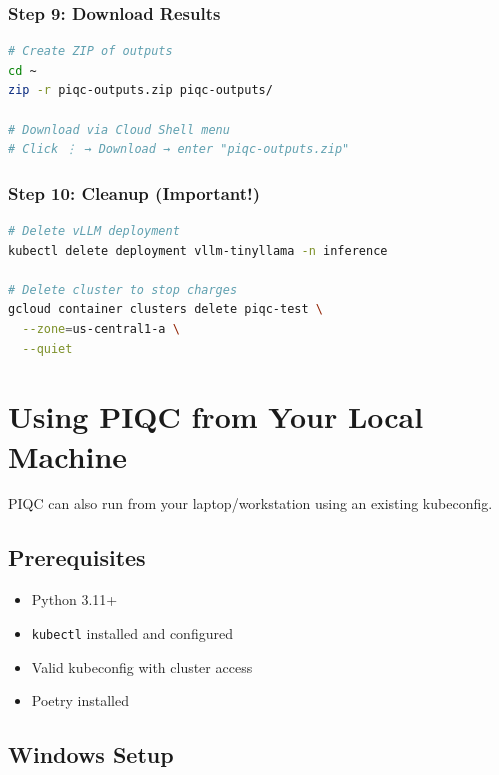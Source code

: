 \documentclass[11pt,a4paper]{article}
\begin{document}
\subsubsection{Step 9: Download Results}

\begin{lstlisting}[language=bash]
# Create ZIP of outputs
cd ~
zip -r piqc-outputs.zip piqc-outputs/

# Download via Cloud Shell menu
# Click ⋮ → Download → enter "piqc-outputs.zip"
\end{lstlisting}

\subsubsection{Step 10: Cleanup (Important!)}

\begin{lstlisting}[language=bash]
# Delete vLLM deployment
kubectl delete deployment vllm-tinyllama -n inference

# Delete cluster to stop charges
gcloud container clusters delete piqc-test \
  --zone=us-central1-a \
  --quiet
\end{lstlisting}

\section{Using PIQC from Your Local Machine}

PIQC can also run from your laptop/workstation using an existing kubeconfig.

\subsection{Prerequisites}

\begin{itemize}
    \item Python 3.11+
    \item \texttt{kubectl} installed and configured
    \item Valid kubeconfig with cluster access
    \item Poetry installed
\end{itemize}

\subsection{Windows Setup}
\end{document}
